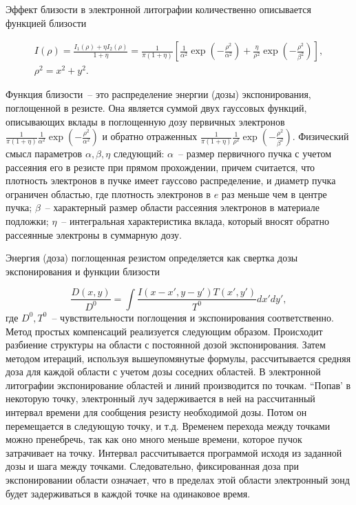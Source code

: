Эффект близости в электронной литографии количественно описывается функцией близости

\begin{gather}
I(\rho)=\frac{I_1 (\rho)+ \eta I_2(\rho)}{1+\eta}=\frac{1}{\pi(1+\eta)}\left[\frac{1}{\alpha^2}\exp\left(-\frac{\rho^2}{\alpha^2}\right)+\frac{\eta}{\rho^2}\exp\left(-\frac{\rho^2}{\beta^2}\right)\right],\label{eq:A8}\\
\rho^2 = x^2 + y^2.\nonumber
\end{gather}

Функция близости~-- это распределение энергии (дозы) экспонирования, поглощенной в резисте. Она является суммой двух гауссовых функций, описывающих вклады в поглощенную дозу первичных электронов
$\frac{1}{\pi(1+\eta)} \frac{1}{\alpha^2} \exp\left(-\frac{\rho^2}{\alpha^2}\right) $ и обратно отраженных $\frac{1}{\pi(1+\eta)} \frac{1}{\rho^2} \exp \left(-\frac{\rho^2}{\beta^2}\right)$. 
Физический смысл параметров $\alpha,\beta,\eta$ следующий: $\alpha$~-- размер первичного пучка с учетом рассеяния его в резисте при прямом прохождении, причем считается, что плотность электронов в пучке имеет гауссово распределение, и диаметр пучка ограничен областью, где плотность электронов в $e$ раз меньше чем в центре пучка; $\beta$~-- характерный размер области рассеяния электронов в материале подложки; $\eta$~-- интегральная характеристика вклада, который вносят обратно рассеянные электроны в суммарную дозу.

Энергия (доза) поглощенная резистом определяется как свертка дозы экспонирования и функции близости

\begin{equation}
\frac{D(x,y)}{D^0}= \int \frac{I(x-x',y-y')T(x',y')}{T^0} dx' dy',
\label{eq:A9}
\end{equation}
где $D^0,T^0$~-- чувствительности поглощения и экспонирования соответственно.
Метод простых компенсаций реализуется следующим образом. Происходит разбиение структуры на области с постоянной дозой экспонирования. Затем методом итераций, используя вышеупомянутые формулы, рассчитывается средняя доза для каждой области с учетом дозы соседних областей. В электронной литографии экспонирование областей и линий производится по точкам. “Попав’ в некоторую точку, электронный луч задерживается в ней на рассчитанный интервал времени для сообщения резисту необходимой дозы. Потом он перемещается в следующую точку, и т.д. Временем перехода между точками можно пренебречь, так как оно много меньше времени, которое пучок затрачивает на точку. Интервал рассчитывается программой исходя из заданной дозы и шага между точками. Следовательно, фиксированная доза при экспонировании области означает, что в пределах этой области электронный зонд будет задерживаться в каждой точке на одинаковое время.

